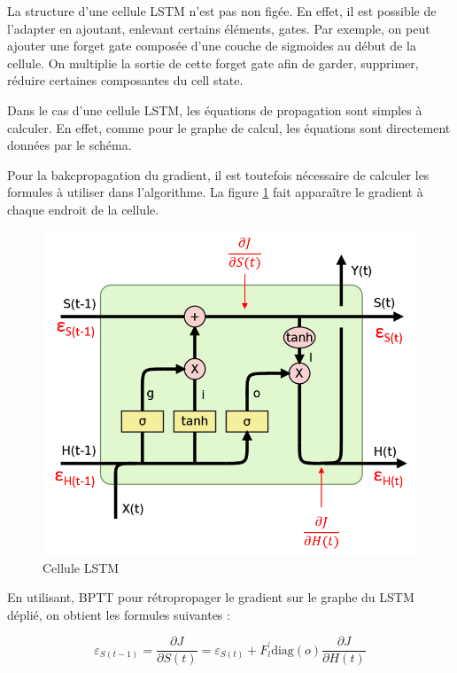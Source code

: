 \documentclass{report}
\theoremstyle{plain}
\theoremstyle{definition}
\theoremstyle{remark}
\begin{document}
La structure d'une cellule LSTM n'est pas non figée. En effet, il est possible de l'adapter en ajoutant, enlevant certains éléments, gates. Par exemple, on peut ajouter une forget gate composée d'une couche de sigmoides au début de la cellule. On multiplie la sortie de cette forget gate afin de garder, supprimer, réduire certaines composantes du cell state. 

\break

Dans le cas d'une cellule LSTM, les équations de propagation sont simples à calculer. En effet, comme pour le graphe de calcul, les équations sont directement données par le schéma.

Pour la bakcpropagation du gradient, il est toutefois nécessaire de calculer les formules à utiliser dans l'algorithme. La figure \ref{cellule LSTM gradient} fait apparaître le gradient à chaque endroit de la cellule.

\begin{figure}[h!]
\begin{center}
\includegraphics[scale=0.3]{images/LSTM_gradient.png}
\caption{Cellule LSTM}
\label{cellule LSTM gradient}
\end{center}
\end{figure}


En utilisant, BPTT pour rétropropager le gradient sur le graphe du LSTM déplié, on obtient les formules suivantes :

\begin{equation}
\varepsilon_{S(t-1)} = \frac{\partial J}{\partial S(t)} = \varepsilon_{S(t)} + F_{l}^{\prime}\text{diag}(o)\frac{\partial J}{\partial H(t)}
\end{equation}
\end{document}
